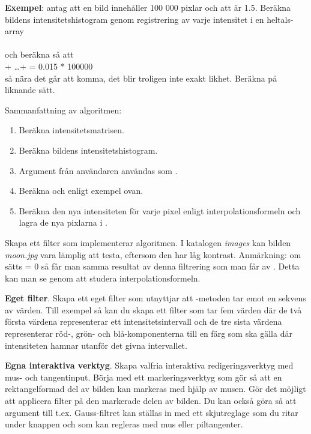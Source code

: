 \noindent \textbf{Exempel}: antag att en bild innehåller 100 000 pixlar och att  är 1.5. Beräkna bildens intensitetshistogram genom registrering av varje intensitet i en heltals-array \\  \\och beräkna  så att \\ + \ldots +  = 0.015 * 100000 \\så nära det går att komma, det blir troligen inte exakt likhet. Beräkna  på liknande sätt.

\vspace{1em}


\noindent Sammanfattning av algoritmen:
\begin{enumerate}
	\item Beräkna intensitetsmatrisen.
	\item Beräkna bildens intensitetshistogram.
	\item Argument från användaren användas som .
	\item Beräkna  och  enligt exempel ovan.
	\item Beräkna den nya intensiteten för varje pixel enligt interpolationsformeln och lagra de nya pixlarna i .
\end{enumerate}
Skapa ett filter  som implementerar algoritmen. I katalogen \emph{images} kan bilden \emph{moon.jpg} vara lämplig att testa, eftersom den har låg kontrast. Anmärkning: om  sätts = 0 så får man samma resultat av denna filtrering som man får av . Detta kan man se genom att studera interpolationsformeln.

\Task \textbf{Eget filter}. Skapa ett eget filter som utnyttjar att -metoden tar emot en sekvens av värden. Till exempel så kan du skapa ett filter som tar fem värden där de två första värdena representerar ett intensitetsintervall och de tre sista värdena representerar röd-, grön- och blå-komponenterna till en färg som ska gälla där intensiteten hamnar utanför det givna intervallet. 

\Task \textbf{Egna interaktiva verktyg}. Skapa valfria interaktiva redigeringsverktyg med mus- och tangentinput. Börja med ett markeringsverktyg som gör så att en rektangelformad del av bilden kan markeras med hjälp av musen. Gör det möjligt att applicera filter på den markerade delen av bilden. Du kan också göra så att argument till t.ex. Gauss-filtret kan ställas in med ett skjutreglage som du ritar under knappen och som kan regleras med mus eller piltangenter.
